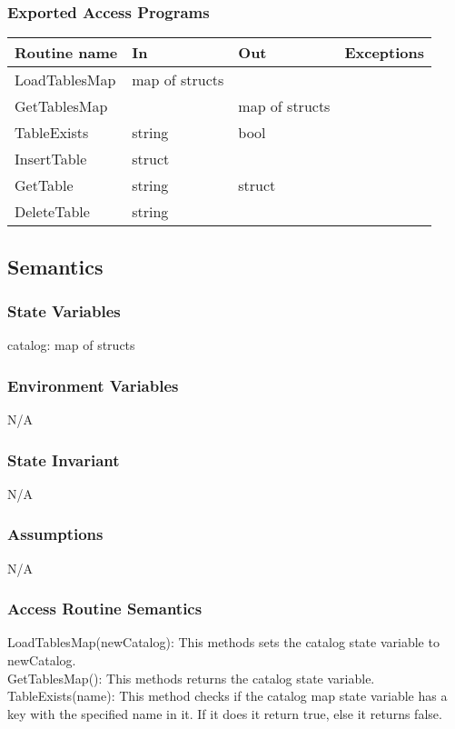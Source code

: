 \documentclass[12pt]{article}
\begin{document}
\subsubsection{Exported Access Programs}
\begin{tabular}{| l | l | l | l |}
\hline
\textbf{Routine name} & \textbf{In} & \textbf{Out} & \textbf{Exceptions}\\
\hline
LoadTablesMap & map of structs & & \\
GetTablesMap & & map of structs & \\
TableExists & string & bool & \\
InsertTable & struct & & \\
GetTable & string & struct & \\
DeleteTable & string & & \\
\hline
\end{tabular}

\subsection{Semantics}
\subsubsection{State Variables}
catalog: map of structs

\subsubsection{Environment Variables}
N/A
\subsubsection{State Invariant}
N/A
\subsubsection{Assumptions}
N/A

\subsubsection{Access Routine Semantics}
\noindent LoadTablesMap(newCatalog): This methods sets the catalog state variable to newCatalog.\\

\noindent GetTablesMap(): This methods returns the catalog state variable.\\

\noindent TableExists(name): This method checks if the catalog map state variable has a key with the specified name in it. If it does it return true, else it returns false.\\
\end{document}
